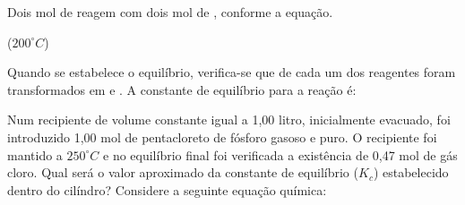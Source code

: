 \documentclass[a4paper,12]{exam}
\begin{document}
\begin{multicols}{2}
\begin{questions}
				\question Dois mol de  reagem com dois mol de , conforme a equação.
				\begin{center}
					 ($200^{\circ}C$)
				\end{center}
				Quando se estabelece o equilíbrio, verifica-se que  de cada um dos reagentes foram transformados em  e . A constante de equilíbrio para a reação é:
				\makeemptybox{2cm}

				\question Num recipiente de volume constante igual a 1,00 litro, inicialmente evacuado, foi introduzido 1,00 mol de pentacloreto de fósforo gasoso e puro. O recipiente foi mantido a $250^{\circ}C$ e no equilíbrio final foi verificada a existência de 0,47 mol de gás cloro. Qual será o valor aproximado da constante de equilíbrio ($K_c$) estabelecido dentro do cilíndro? Considere a seguinte equação química:
				\begin{center}
				\end{center}
				\makeemptybox{2cm}






	\end{questions}
\end{multicols}
\end{document}
